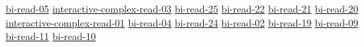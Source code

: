 \hyperref[sec:bi-read-05]{bi-read-05}
\hyperref[sec:interactive-complex-read-03]{interactive-complex-read-03}
\hyperref[sec:bi-read-25]{bi-read-25}
\hyperref[sec:bi-read-22]{bi-read-22}
\hyperref[sec:bi-read-21]{bi-read-21}
\hyperref[sec:bi-read-20]{bi-read-20}
\hyperref[sec:interactive-complex-read-01]{interactive-complex-read-01}
\hyperref[sec:bi-read-04]{bi-read-04}
\hyperref[sec:bi-read-24]{bi-read-24}
\hyperref[sec:bi-read-02]{bi-read-02}
\hyperref[sec:bi-read-19]{bi-read-19}
\hyperref[sec:bi-read-09]{bi-read-09}
\hyperref[sec:bi-read-11]{bi-read-11}
\hyperref[sec:bi-read-10]{bi-read-10}
